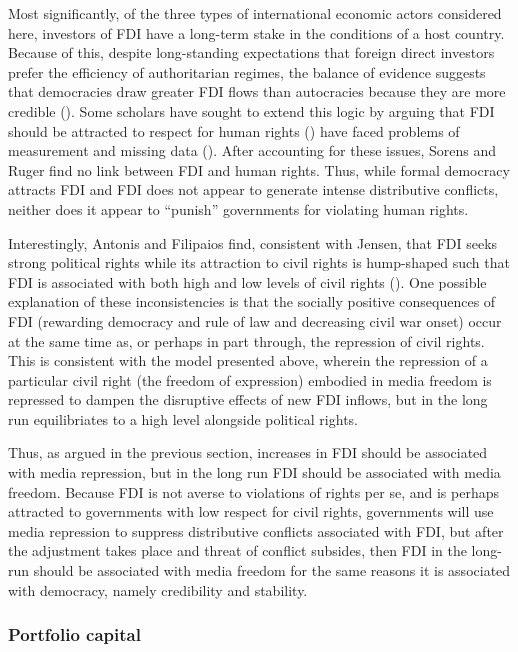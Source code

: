 \documentclass[12pt]{report}
\begin{document}
Most significantly, of the three types of international economic actors
considered here, investors of FDI have a long-term stake in the conditions
of a host country. Because of this, despite long-standing expectations
that foreign direct investors prefer the efficiency of authoritarian
regimes, the balance of evidence suggests that democracies draw greater
FDI flows than autocracies because they are more credible (\citealt[588]{Jensen:2003to}).
Some scholars have sought to extend this logic by arguing that FDI
should be attracted to respect for human rights (\citealt{Blanton:2007ep})
have faced problems of measurement and missing data (\citealt{Sorens:2012hc}).
After accounting for these issues, Sorens and Ruger find no link between
FDI and human rights. Thus, while formal democracy attracts FDI and
FDI does not appear to generate intense distributive conflicts, neither
does it appear to ``punish'' governments for violating human rights.

Interestingly, Antonis and Filipaios find, consistent with Jensen,
that FDI seeks strong political rights while its attraction to civil
rights is hump-shaped such that FDI is associated with both high and
low levels of civil rights (\citeyear{Adam:2007gn}). One possible
explanation of these inconsistencies is that the socially positive
consequences of FDI (rewarding democracy and rule of law and decreasing
civil war onset) occur at the same time as, or perhaps in part through,
the repression of civil rights. This is consistent with the model
presented above, wherein the repression of a particular civil right
(the freedom of expression) embodied in media freedom is repressed
to dampen the disruptive effects of new FDI inflows, but in the long
run equilibriates to a high level alongside political rights.

Thus, as argued in the previous section, increases in FDI should be
associated with media repression, but in the long run FDI should be
associated with media freedom. Because FDI is not averse to violations
of rights per se, and is perhaps attracted to governments with low
respect for civil rights, governments will use media repression to
suppress distributive conflicts associated with FDI, but after the
adjustment takes place and threat of conflict subsides, then FDI in
the long-run should be associated with media freedom for the same
reasons it is associated with democracy, namely credibility and stability.

\subsubsection{Portfolio capital}
\end{document}
